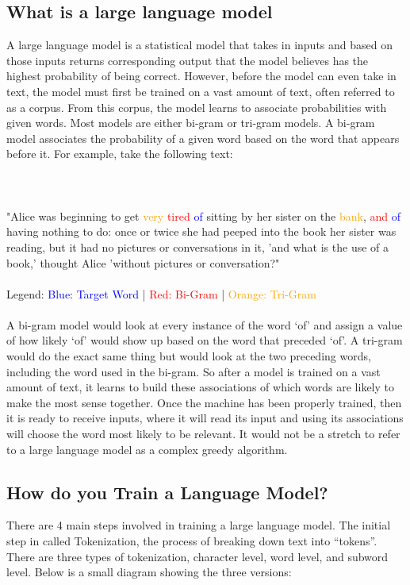 \documentclass[10pt,twocolumn]{article}
\begin{document}
\subsection{What is a large language model}

A large language model is a statistical model that takes in inputs and based on those inputs returns corresponding output that the model believes has the highest probability of being correct. However, before the model can even take in text, the model must first be trained on a vast amount of text, often referred to as a corpus. From this corpus, the model learns to associate probabilities with given words. Most models are either bi-gram or tri-gram models. A bi-gram model associates the probability of a given word based on the word that appears before it. For example, take the following text: 
\\
\\
\\
\\

"Alice was beginning to get \textcolor{orange}{very} \textcolor{red}{tired} \textcolor{blue}{of}
sitting by her sister on the \textcolor{orange}{bank}, \textcolor{red}{and} \textcolor{blue}{of}
having nothing to do: once or twice she
had peeped into the book her sister was
reading, but it had no pictures or
conversations in it, 'and what is the use
of a book,' thought Alice 'without
pictures or conversation?"
\\
\\
Legend: \textcolor{blue}{Blue: Target Word} | \textcolor{red}{Red: Bi-Gram} | \textcolor{orange}{Orange: Tri-Gram}
\\
\\
\indent A bi-gram model would look at every instance of the word ‘of’ and assign a value of how likely ‘of’ would show up based on the word that preceded ‘of’. A tri-gram would do the exact same thing but would look at the two preceding words, including the word used in the bi-gram. So after a model is trained on a vast amount of text, it learns to build these associations of which words are likely to make the most sense together.  Once the machine has been properly trained, then it is ready to receive inputs, where it will read its input and using its associations will choose the word most likely to be relevant. It would not be a stretch to refer to a large language model as a complex greedy algorithm.

\subsection{How do you Train a Language Model?}
There are 4 main steps involved in training a large language model. The initial step in called Tokenization, the  process of breaking down text into “tokens”. There are three types of tokenization, character level, word level, and subword level. Below is a small diagram showing the three versions\cite{benyou_csc6203cie6021_nodate}: 
\end{document}
